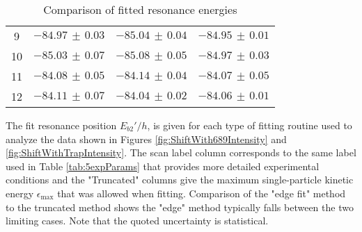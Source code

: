 \begin{table}[]
{\begin{tabular}{|c|ccc|}
		9 & $-84.97\,\pm\,0.03$ & $-85.04\,\pm\,0.04$ & $-84.95\,\pm\,0.01$ \\
		10 & $-85.03\,\pm\,0.07$ & $-85.08\,\pm\,0.05$ & $-84.97\,\pm\,0.03$ \\
		11 & $-84.08\,\pm\,0.05$ & $-84.14\,\pm\,0.04$ & $-84.07\,\pm\,0.05$ \\
		12 & $-84.11\,\pm\,0.07$ & $-84.04\,\pm\,0.02$ & $-84.06\,\pm\,0.01$ \\ \hline
		\end{tabular}%
		}
		\caption{Comparison of fitted resonance energies}{The fit resonance position $E_{b2}'/h$, is given for each type of fitting routine used to analyze the data shown in Figures \ref{fig:ShiftWith689Intensity} and \ref{fig:ShiftWithTrapIntensity}. The scan label column corresponds to the same label used in Table \ref{tab:5expParams} that provides more detailed experimental conditions and the "Truncated" columns give the maximum single-particle kinetic energy $\epsilon_\text{max}$ that was allowed when fitting. Comparison of the "edge fit" method to the truncated method shows the "edge" method typically falls between the two limiting cases. Note that the quoted uncertainty is statistical.}
		\label{tab:ComparisonFitting}
	\end{table}

